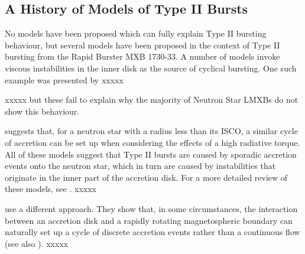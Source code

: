 \subsection{A History of Models of Type II Bursts}

\label{sec:TIImod}

\par No models have been proposed which can fully explain Type II bursting behaviour, but several models have been proposed in the context of Type II bursting from the Rapid Burster MXB 1730-33.  A number of models invoke viscous instabilities in the inner disk as the source of cyclical bursting.  One such example was presented by \citet{Taam_Evo} xxxxx
\par \citet{Hayakawa_Type2Mod} xxxxx but these fail to explain why the majority of Neutron Star LMXBs do not show this behaviour.
\par \citet{Walker_Type2Mod} suggests that, for a neutron star with a radius less than its ISCO, a similar cycle of accretion can be set up when considering the effects of a high radiative torque.  All of these models suggest that Type II bursts are caused by sporadic accretion events onto the neutron star, which in turn are caused by instabilities that originate in the inner part of the accretion disk.  For a more detailed review of these models, see \citet{Lewin_Bursts}. xxxxx
\par \citet{Spruit_Type2Mod} use a different approach.  They show that, in some circumstances, the interaction between an accretion disk and a rapidly rotating magnetospheric boundary can naturally set up a cycle of discrete accretion events rather than a continuous flow  (see also \citealp{Dangelo_Episodic1,Dangelo_Episodic2,vandenEijnden_RB,Scaringi_Gating}). xxxxx